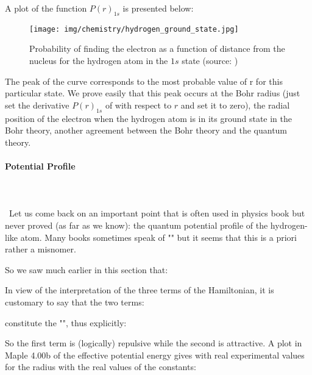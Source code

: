 	A plot of the function $P(r)_{1s}$ is presented below:
	\begin{figure}[H]
		\centering
		\texttt{[image: img/chemistry/hydrogen\_ground\_state.jpg]}	
		\caption[Probability of finding the electron as a function of distance from the nucleus for the hydrogen atom in the $1s$ state]{Probability of finding the electron as a function of distance from the nucleus for the hydrogen atom in the $1s$ state (source: \cite{serway2018physics})}
	\end{figure}
	The peak of the curve corresponds to the most probable value of r for this particular state. We prove easily that this peak occurs at the Bohr radius (just set the derivative $P(r)_{1s}$ of with respect to $r$ and set it to zero), the radial position of the electron when the hydrogen atom is in its ground state in the Bohr theory, another agreement between the Bohr theory and the quantum theory.
	
	\paragraph{Potential Profile}\mbox{}\\\\\
	Let us come back on an important point that is often used in physics book but never proved (as far as we know): the quantum potential profile of the hydrogen-like atom. Many books sometimes speak of "" but it seems that this is a priori rather a misnomer.

	So we saw much earlier in this section that:
	
	In view of the interpretation of the three terms of the Hamiltonian, it is customary to say that the two terms:
	
	constitute the "", thus explicitly:
	
	So the first term is (logically) repulsive while the second is attractive. A plot in Maple 4.00b of the effective potential energy gives with real experimental values for the radius with the real values of the constants:\\
	

